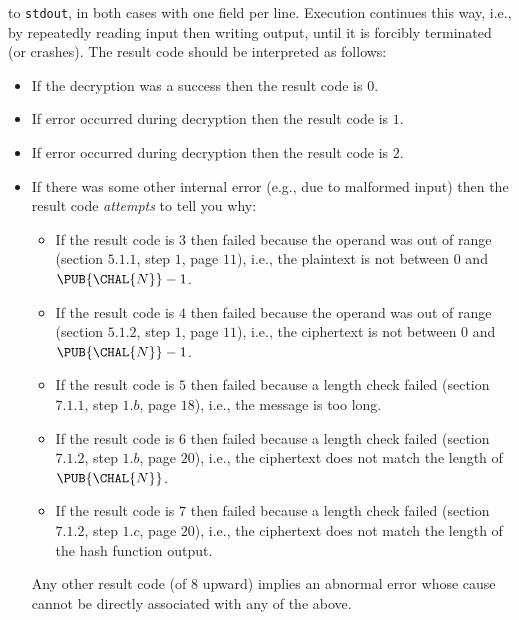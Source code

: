 \documentclass[crop={false},multi={true},tikz={true}]{standalone}
\begin{document}
\noindent
to \lstinline[language={bash}]{stdout}, in both cases with one field per 
line.  Execution continues this way, i.e., by repeatedly reading input 
then writing output, until it is forcibly terminated (or crashes).  
The result code should be interpreted as follows:

\begin{itemize}
\item If the decryption was a success                   
      then the result code is $0$.
\item If error  occurred during decryption 
      then the result code is $1$.
\item If error  occurred during decryption 
      then the result code is $2$.
\item If there was some other internal error (e.g., due to malformed input)
      then the result code {\em attempts} to tell you why: 

      \begin{itemize}
      \item If the result code is $3$ then               
            failed because the operand was out of range 
            (section $5.1.1$, step $1$, page $11$), 
            i.e., the  plaintext is not between $0$ and $\PUB{\CHAL{N}}-1$.
      \item If the result code is $4$ then               
            failed because the operand was out of range 
            (section $5.1.2$, step $1$, page $11$), 
            i.e., the ciphertext is not between $0$ and $\PUB{\CHAL{N}}-1$.
      \item If the result code is $5$ then  
            failed because a length check failed        
            (section $7.1.1$, step $1.b$, page $18$), 
            i.e., the message is too long.
      \item If the result code is $6$ then  
            failed because a length check failed        
            (section $7.1.2$, step $1.b$, page $20$), 
            i.e., the ciphertext does not match the length of $\PUB{\CHAL{N}}$.
      \item If the result code is $7$ then  
            failed because a length check failed        
            (section $7.1.2$, step $1.c$, page $20$), 
            i.e., the ciphertext does not match the length of the hash function output.
      \end{itemize}

      \noindent
      Any other result code (of $8$ upward) implies an abnormal error whose
      cause cannot be directly associated with any of the above.
\end{itemize}
\end{document}
